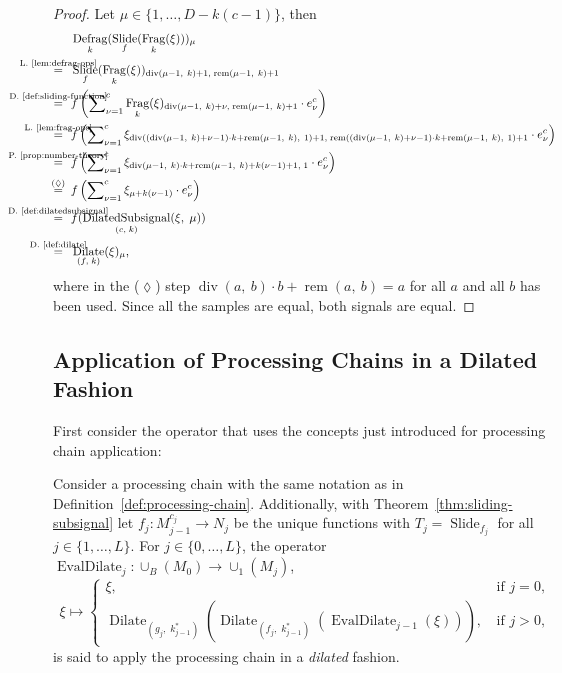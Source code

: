 \documentclass[journal]{IEEEtran}
\newcommand{\ROI}{B}
\newcommand{\discint}[2]{\{#1,\dotsc,#2\}}
\newcommand{\inint}[2]{\in\discint{#1}{#2}}
\DeclareMathOperator{\Slide}{Slide}
\DeclareMathOperator{\Fragmentation}{Frag}
\DeclareMathOperator{\Defragmentation}{Defrag}
\renewcommand{\div}[2]{\operatorname{div}(#1,\ #2)}
\newcommand{\rem}[2]{\operatorname{rem}(#1,\ #2)}
\newcommand{\equsing}[1]{\overset{\mathclap{\text{#1}}}{=}}
\DeclareMathOperator{\DilatedSubsignal}{DilatedSubsignal}
\DeclareMathOperator{\Dilate}{Dilate}
\DeclareMathOperator{\EvalDilate}{EvalDilate}
\begin{document}
\begin{proof}
Let $\mu\inint{1}{D - k(c - 1)}$, then
\begin{align*}
  & \Defragmentation_k(\Slide_f(\Fragmentation_k(\xi)))_\mu\\
  \equsing{L.~\ref{lem:defrag-ops}}\ \ & \Slide_f(\Fragmentation_k(\xi))_{\div{\mu - 1}{k} + 1,\; \rem{\mu - 1}{k} + 1}\\
  \equsing{D.~\ref{def:sliding-function}}\ \ & f\left(\sum\nolimits_{\nu = 1}^c \Fragmentation_k(\xi)_{\div{\mu - 1}{k} + \nu,\; \rem{\mu - 1}{k} + 1}\cdot  e_\nu^c\right)\\
  \equsing{L.~\ref{lem:frag-ops}}\ \ & f\left(\sum\nolimits_{\nu = 1}^c \xi_{\div{(\div{\mu - 1}{k} + \nu - 1)\cdot k + \rem{\mu - 1}{k}}{1} + 1,\;\rem{(\div{\mu - 1}{k} + \nu - 1)\cdot k + \rem{\mu - 1}{k}}{1} + 1}\cdot  e_\nu^c\right)\\
  \equsing{P.~\ref{prop:number-theory}}\ \ & f\left(\sum\nolimits_{\nu = 1}^c \xi_{\div{\mu - 1}{k}\cdot k + \rem{\mu - 1}{k} + k(\nu - 1) + 1,\; 1}\cdot  e_\nu^c\right)\\
  \equsing{($\lozenge$)}\ \ & f\left(\sum\nolimits_{\nu = 1}^c \xi_{\mu + k(\nu - 1)}\cdot  e_\nu^c\right)\\
  \equsing{D.~\ref{def:dilatedsubsignal}}\ \ & f(\DilatedSubsignal_{(c,\;k)}(\xi,\;\mu))\\
  \equsing{D.~\ref{def:dilate}}\ \ & \Dilate_{(f,\; k)}(\xi)_\mu\text{,}
\end{align*}
where in the ($\lozenge$) step $\div{a}{b}\cdot b + \rem{a}{b} = a$ for all $a$ and all $b$ has been used.
Since all the samples are equal, both signals are equal.
\end{proof}\subsection{Application of Processing Chains in a Dilated Fashion}
First consider the operator that uses the concepts just introduced for processing chain application:
\begin{definition}
\label{def:evaldilate}
Consider a processing chain with the same notation as in Definition~\ref{def:processing-chain}.
Additionally, with Theorem~\ref{thm:sliding-subsignal} let $f_j\colon M_{j - 1}^{c_j}\to N_j$ be the unique functions with $T_j = \Slide_{f_j}$ for all $j\inint{1}{L}$.
For $j\inint{0}{L}$, the operator $\EvalDilate_j\colon\cup_\ROI(M_0)\to\cup_1(M_j)$,
\begin{displaymath}
  \xi\mapsto
  \begin{cases}
    \xi\text{,} & \text{if } j = 0\text{,}\\
    \Dilate_{(g_j,\; k_{j - 1}^*)}( \Dilate_{(f_j,\; k_{j - 1}^*)}( \EvalDilate_{j - 1}(\xi) ) )\text{, } & \text{if } j > 0\text{,}
  \end{cases}
\end{displaymath}
is said to apply the processing chain in a \emph{dilated} fashion.
\end{definition}
\end{document}
